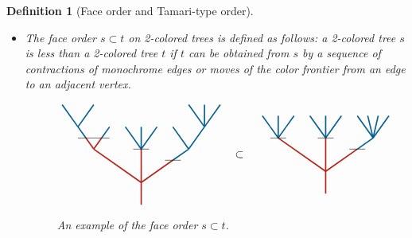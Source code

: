 \documentclass[twoside, 12pt]{amsart}
\newtheorem{definition}{Definition}[section]
\theoremstyle{remark}
\begin{document}
\begin{definition}[Face order and Tamari-type order]\leavevmode

\begin{itemize}
\item[$\diamond$] 
The \emph{face order} $s\subset t$ on 2-colored trees is defined as follows: a 2-colored tree $s$ is less than a 2-colored tree $t$ if $t$ can be obtained from $s$ by a sequence of contractions of monochrome edges or moves of the color frontier from an edge to an adjacent vertex.

\begin{figure}[h]
\[\vcenter{\hbox{
\begin{tikzpicture}[yscale=0.7,xscale=1]
\draw[very thick, MidnightBlue] (-2.5,3.5)--(-2,2.5);
\draw[very thick, MidnightBlue] (-1.5,3.5)--(-2,2.5);
\draw[very thick, MidnightBlue] (-2,2.5) -- (-1.75,2);
\draw[very thick, MidnightBlue] (-1.25, 2) -- (-1,2.5);
\draw[very thick, MidnightBlue] (-0.5,2.5) -- (0,1.5);
\draw[very thick, MidnightBlue] (0,1.5)--(0,2.5);
\draw[very thick, MidnightBlue] (0,1.5)--(0.5,2.5);
\draw[very thick, MidnightBlue] (1,1)--(1.5,1.5);
\draw[very thick, MidnightBlue] (1.5,1.5)--(1,2.5);
\draw[very thick, MidnightBlue] (1.5,1.5)--(2,2.5);
\draw[very thick, MidnightBlue] (2,2.5)--(1.5,3.5);
\draw[very thick, MidnightBlue] (2,2.5)--(2,3.5);
\draw[very thick, MidnightBlue] (2,2.5)--(2.5,3.5);
\draw[very thick, BrickRed] (0,-1)--(0, 1.5); 
\draw[very thick, BrickRed] (0,0)--(-1.5,1.5);
\draw[very thick, BrickRed] (-1.5,1.5)--(-1.75, 2); 
\draw[very thick, BrickRed] (-1.5,1.5)--(-1.25, 2); 
\draw[very thick, BrickRed] (0,0)--(1, 1);
\draw (-2,2) to (-1,2); 
\draw (-0.25,1.5)-- (0.25, 1.5) ; 
\draw (0.75,1) to (1.25,1);
\end{tikzpicture}}}
\quad \subset \quad
\vcenter{\hbox{
\begin{tikzpicture}[yscale=0.7,xscale=1]
\draw[very thick, MidnightBlue] (-1.5,1.5)--(-1.5,2.5);
\draw[very thick, MidnightBlue] (-2,2.5) -- (-1.75,2);
\draw[very thick, MidnightBlue] (-1.25, 2) -- (-1,2.5);
\draw[very thick, MidnightBlue] (-0.5,2.5) -- (0,1.5);
\draw[very thick, MidnightBlue] (0,1.5)--(0,2.5);
\draw[very thick, MidnightBlue] (0,1.5)--(0.5,2.5);
\draw[very thick, MidnightBlue] (1,1)--(1.5,1.5);
\draw[very thick, MidnightBlue] (1.5,1.5)--(1,2.5);
\draw[very thick, MidnightBlue] (1.5,1.5)--(1.33,2.5);
\draw[very thick, MidnightBlue] (1.5,1.5)--(1.66,2.5);
\draw[very thick, MidnightBlue] (1.5,1.5)--(2,2.5);
\draw[very thick, MidnightBlue] (-1.5,1.5)--(-1.75, 2); 
\draw[very thick, MidnightBlue] (-1.5,1.5)--(-1.25, 2); 
\draw[very thick, BrickRed] (0,-1)--(0, 1.5); 
\draw[very thick, BrickRed] (0,0)--(-1.5,1.5);
\draw[very thick, BrickRed] (0,0)--(1, 1);
\draw (-1.75,1.5) to (-1.25,1.5); 
\draw (-0.25,1.5) to (0.25,1.5); 
\draw (0.75,1) to (1.25,1);
\end{tikzpicture}}}
\]
\caption{An example of the face order $s\subset t$.}
\label{Fig2:InclusionOrder}
\end{figure}


\end{itemize}
\end{definition}
\end{document}
